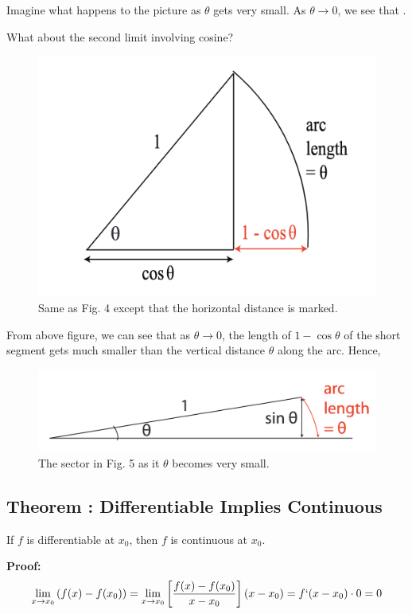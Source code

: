 Imagine what happens to the picture as $\theta$ gets very small.
As $\theta \to 0$, we see that .

\pagebreak

What about the second limit involving cosine?

\begin{figure}[ht!]
	\centering
	\includegraphics[scale=0.5]{./images/lecture_2_figure_3.png}
	\caption{Same as Fig. 4 except that the horizontal distance is marked.}    
\end{figure}


From above figure, we can see that as $\theta \to 0$, the length of $1-\cos \theta$ of the short segment gets much smaller than the vertical distance $\theta$ along the arc.
Hence,  


\begin{figure}[ht!]
	\centering
	\includegraphics[scale=0.5]{./images/lecture_2_figure_4.png}
	\caption{The sector in Fig. 5 as it $\theta$ becomes very small.}    
\end{figure}

\subsection*{Theorem : Differentiable Implies Continuous}
If $f$ is differentiable at $x_0$, then $f$ is continuous at $x_0$.


{\bf Proof:} 
$$
	\lim_{x \to x_0} \left( f(x) - f(x_0) \right)
	= \lim_{x \to x_0} \left[ \frac{f(x) - f(x_0)}{x-x_0} \right] (x - x_0) = f`(x-x_0) \cdot 0 = 0 
$$
